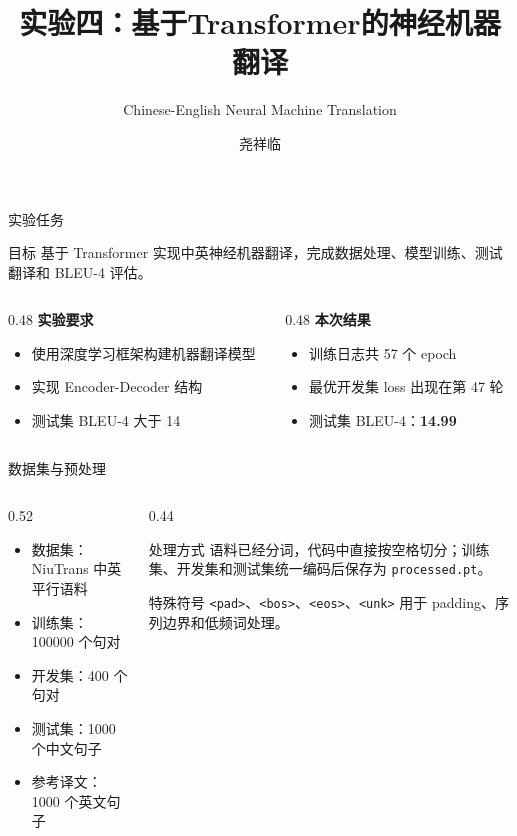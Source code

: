 \documentclass[aspectratio=169,10pt]{ctexbeamer}
\title{实验四：基于Transformer的神经机器翻译}
\subtitle{Chinese-English Neural Machine Translation}
\author{尧祥临 \quad 202518023406038}
\institute{中国科学院大学 \quad 前沿交叉科学学院\\2026年春季学期\quad 深度学习}
\date{}
\begin{document}
\begin{frame}
	\titlepage
\end{frame}

\begin{frame}{实验任务}
	\begin{block}{目标}
		基于 Transformer 实现中英神经机器翻译，完成数据处理、模型训练、测试翻译和 BLEU-4 评估。
	\end{block}

	\begin{columns}[T,onlytextwidth]
		\begin{column}{0.48\textwidth}
			\textbf{实验要求}
			\begin{itemize}
				\item 使用深度学习框架构建机器翻译模型
				\item 实现 Encoder-Decoder 结构
				\item 测试集 BLEU-4 大于 14
			\end{itemize}
		\end{column}
		\begin{column}{0.48\textwidth}
			\textbf{本次结果}
			\begin{itemize}
				\item 训练日志共 57 个 epoch
				\item 最优开发集 loss 出现在第 47 轮
				\item 测试集 BLEU-4：\textbf{14.99}
			\end{itemize}
		\end{column}
	\end{columns}
\end{frame}

\begin{frame}{数据集与预处理}
	\begin{columns}[T,onlytextwidth]
		\begin{column}{0.52\textwidth}
			\begin{itemize}
				\item 数据集：NiuTrans 中英平行语料
				\item 训练集：100000 个句对
				\item 开发集：400 个句对
				\item 测试集：1000 个中文句子
				\item 参考译文：1000 个英文句子
			\end{itemize}
		\end{column}
		\begin{column}{0.44\textwidth}
			\begin{block}{处理方式}
				语料已经分词，代码中直接按空格切分；训练集、开发集和测试集统一编码后保存为 \texttt{processed.pt}。
			\end{block}
			\begin{block}{特殊符号}
				\texttt{<pad>}、\texttt{<bos>}、\texttt{<eos>}、\texttt{<unk>} 用于 padding、序列边界和低频词处理。
			\end{block}
		\end{column}
	\end{columns}
\end{frame}
\end{document}
